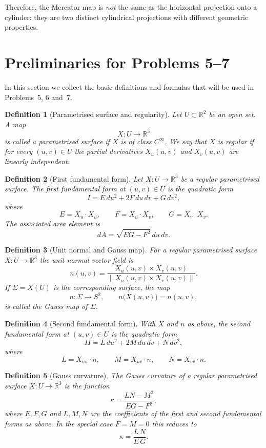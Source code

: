 \documentclass[12pt,a4paper]{article}
\theoremstyle{plain}
\newtheorem{definition}{Definition}
\theoremstyle{definition}      %
\begin{document}
Therefore, the Mercator map is \emph{not} the same as the horizontal
projection onto a cylinder: they are two distinct cylindrical projections
with different geometric properties.


\section*{Preliminaries for Problems 5–7}

In this section we collect the basic definitions and formulas that will be
used in Problems~5, 6 and~7.

\begin{definition}[Parametrised surface and regularity]
	Let $U\subset\mathbb{R}^2$ be an open set. A map
	\[
	X:U\longrightarrow\mathbb{R}^3
	\]
	is called a \emph{parametrised surface} if $X$ is of class $C^\infty$.
	We say that $X$ is \emph{regular} if for every $(u,v)\in U$ the partial
	derivatives $X_u(u,v)$ and $X_v(u,v)$ are linearly independent.
\end{definition}

\begin{definition}[First fundamental form]
	Let $X:U\to\mathbb{R}^3$ be a regular parametrised surface. The
	\emph{first fundamental form} at $(u,v)\in U$ is the quadratic form
	\[
	I = E\,du^2 + 2F\,du\,dv + G\,dv^2,
	\]
	where
	\[
	E = X_u\cdot X_u,\qquad
	F = X_u\cdot X_v,\qquad
	G = X_v\cdot X_v.
	\]
	The associated area element is
	\[
	dA = \sqrt{EG - F^2}\,du\,dv.
	\]
\end{definition}

\begin{definition}[Unit normal and Gauss map]
	For a regular parametrised surface $X:U\to\mathbb{R}^3$ the
	\emph{unit normal vector field} is
	\[
	n(u,v) = \frac{X_u(u,v)\times X_v(u,v)}
	{\|X_u(u,v)\times X_v(u,v)\|}.
	\]
	If $\Sigma = X(U)$ is the corresponding surface, the map
	\[
	n:\Sigma\longrightarrow S^2,\qquad n\bigl(X(u,v)\bigr)=n(u,v),
	\]
	is called the \emph{Gauss map} of $\Sigma$.
\end{definition}

\begin{definition}[Second fundamental form]
	With $X$ and $n$ as above, the \emph{second fundamental form} at
	$(u,v)\in U$ is the quadratic form
	\[
	II = L\,du^2 + 2M\,du\,dv + N\,dv^2,
	\]
	where
	\[
	L = X_{uu}\cdot n,\qquad
	M = X_{uv}\cdot n,\qquad
	N = X_{vv}\cdot n.
	\]
\end{definition}

\begin{definition}[Gauss curvature]
	The \emph{Gauss curvature} of a regular parametrised surface
	$X:U\to\mathbb{R}^3$ is the function
	\[
	\kappa = \frac{LN - M^2}{EG - F^2},
	\]
	where $E,F,G$ and $L,M,N$ are the coefficients of the first and second
	fundamental forms as above. In the special case $F=M=0$ this reduces to
	\[
	\kappa = \frac{L\,N}{E\,G}.
	\]
\end{definition}
\end{document}
